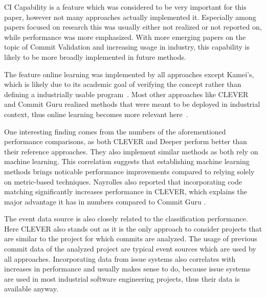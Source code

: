 CI Capability is a feature which was considered to be very important for this paper, however not many approaches actually implemented it. Especially among papers focused on research this was usually either not realized or not reported on, while performance was more emphasized. With more emerging papers on the topic of Commit Validation and increasing usage in industry, this capability is likely to be more broadly implemented in future methods.

The feature online learning was implemented by all approaches except Kamei's, which is likely due to its academic goal of verifying the concept rather than defining a industrially usable program~\cite{Kamei2013}. 
Most other approaches like CLEVER and Commit Guru realized methods that were meant to be deployed in industrial context, thus online learning becomes more relevant here~\cite{Nayrolles2018,Rosen2015}.


One interesting finding comes from the numbers of the aforementioned performance comparisons, as both CLEVER and Deeper perform better than their reference approaches. They also implement similar methods as both rely on machine learning. This correlation suggests that establishing machine learning methods brings noticable performance improvements compared to relying solely on metric-based techniques. Nayrolles also reported that incorporating code matching significantly increases performance in CLEVER, which explains the major advantage it has in numbers compared to Commit Guru \cite{Nayrolles2018}.

The event data source is also closely related to the classification performance. Here CLEVER also stands out as it is the only approach to consider projects that are similar to the project for which commits are analyzed. The usage of previous commit data of the analyzed project are typical event sources which are used by all approaches. Incorporating data from issue systems also correlates with increases in performance and usually makes sense to do, because issue systems are used in most industrial software engineering projects, thus their data is available anyway.

